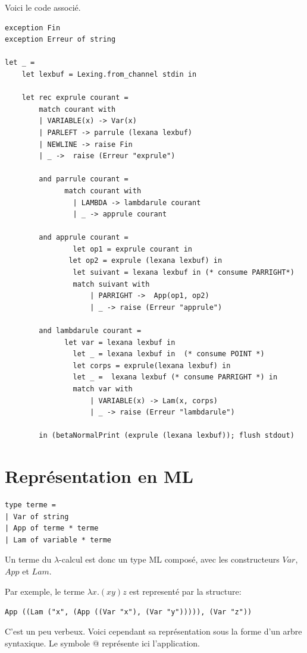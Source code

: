 \documentclass[11pt]{book}
\begin{document}
Voici le code associé.
\begin{Verbatim}
exception Fin
exception Erreur of string
	
let _ =
	let lexbuf = Lexing.from_channel stdin in
				
	let rec exprule courant =
		match courant with
		| VARIABLE(x) -> Var(x)
		| PARLEFT -> parrule (lexana lexbuf)
		| NEWLINE -> raise Fin
		| _ ->  raise (Erreur "exprule")
		
		and parrule courant =
			  match courant with
				| LAMBDA -> lambdarule courant
				| _ -> apprule courant
		 
		and apprule courant =
				let op1 = exprule courant in
			   let op2 = exprule (lexana lexbuf) in
				let suivant = lexana lexbuf in (* consume PARRIGHT*)
				match suivant with 
					| PARRIGHT ->  App(op1, op2) 
					| _ -> raise (Erreur "apprule")
		 
		and lambdarule courant =
			  let var = lexana lexbuf in 
				let _ = lexana lexbuf in  (* consume POINT *)
				let corps = exprule(lexana lexbuf) in
				let _ =  lexana lexbuf (* consume PARRIGHT *) in
				match var with 
					| VARIABLE(x) -> Lam(x, corps)
					| _ -> raise (Erreur "lambdarule")
			
		in (betaNormalPrint (exprule (lexana lexbuf)); flush stdout)
\end{Verbatim}

\section{Représentation en ML}

\begin{Verbatim}
type terme =
| Var of string
| App of terme * terme
| Lam of variable * terme
\end{Verbatim}


Un terme du $\lambda $-calcul est donc un type ML compos\'{e}, avec les constructeurs $Var$, $App$ et $Lam$.

Par exemple, le terme $ \lambda x.(x y) z $ est represent\'{e} par la structure:



\verb+App ((Lam ("x", (App ((Var "x"), (Var "y"))))), (Var "z"))+


C'est un peu verbeux.
Voici cependant sa représentation sous la forme d'un arbre syntaxique. Le symbole @ repr\'{e}sente ici l'application.
\begin{center}
\end{center}
\end{document}
